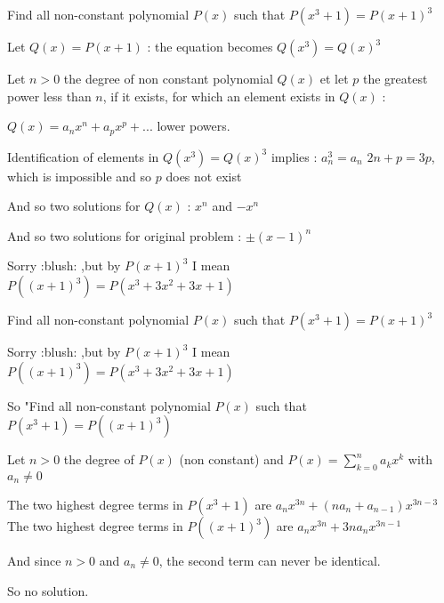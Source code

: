 \begin{solution}
	\begin{tcolorbox}Find all non-constant polynomial $ P(x)$ such that $ P(x^3 + 1) = P(x + 1)^3$\end{tcolorbox}

Let $ Q(x)=P(x+1)$ : the equation becomes $ Q(x^3)=Q(x)^3$

Let $ n>0$ the degree of non constant polynomial $ Q(x)$ et let $ p$ the greatest power less than $ n$, if it exists, for which an element exists in $ Q(x)$ : 

$ Q(x)=a_nx^n+a_px^p+ ...$ lower powers.

Identification of elements in $ Q(x^3)=Q(x)^3$ implies :
$ a_n^3=a_n$
$ 2n+p=3p$, which is impossible and so $ p$ does not exist

And so two solutions for $ Q(x)$ : $ x^n$ and $ -x^n$

And so two solutions for original problem : $ \boxed{\pm(x-1)^n}$
\end{solution}



\begin{solution}
	Sorry  :blush: ,but by $ P(x+1)^3$ I mean $ P((x+1)^3)=P(x^3+3x^2+3x+1)$
\end{solution}



\begin{solution}
	\begin{tcolorbox}Find all non-constant polynomial $ P(x)$ such that $ P(x^3 + 1) = P(x + 1)^3$\end{tcolorbox}
\begin{tcolorbox}Sorry  :blush: ,but by $ P(x + 1)^3$ I mean $ P((x + 1)^3) = P(x^3 + 3x^2 + 3x + 1)$\end{tcolorbox}

So "Find all non-constant polynomial $ P(x)$ such that $ P(x^3 + 1) = P((x + 1)^3)$

Let $ n>0$ the degree of $ P(x)$ (non constant) and $ P(x)=\sum_{k=0}^na_kx^k$ with $ a_n\ne 0$

The two highest degree terms in $ P(x^3 + 1)$ are $ a_nx^{3n}+(na_n+a_{n-1})x^{3n-3}$
The two highest degree terms in $ P((x+1)^3)$ are $ a_nx^{3n}+3na_nx^{3n-1}$

And since $ n>0$ and $ a_n\ne 0$, the second term can never be identical.

So no solution.
\end{solution}



